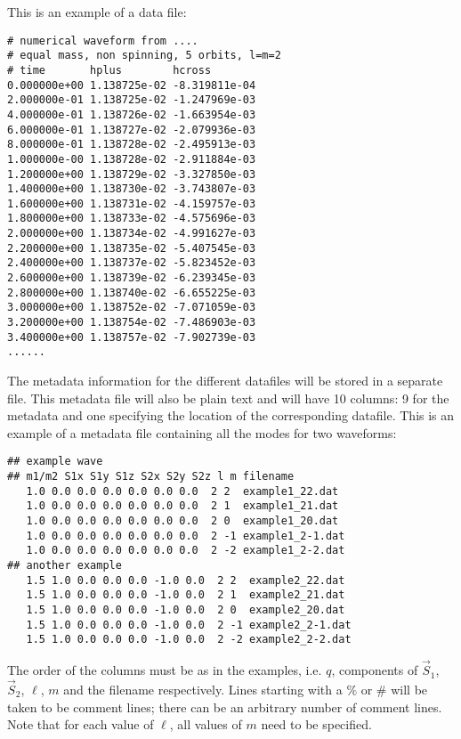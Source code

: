 \documentclass[10pt]{ligodcc}
\begin{document}
This is an example of a data file:

\begin{verbatim}
# numerical waveform from ....
# equal mass, non spinning, 5 orbits, l=m=2
# time       hplus        hcross
0.000000e+00 1.138725e-02 -8.319811e-04
2.000000e-01 1.138725e-02 -1.247969e-03
4.000000e-01 1.138726e-02 -1.663954e-03
6.000000e-01 1.138727e-02 -2.079936e-03
8.000000e-01 1.138728e-02 -2.495913e-03
1.000000e-00 1.138728e-02 -2.911884e-03
1.200000e+00 1.138729e-02 -3.327850e-03
1.400000e+00 1.138730e-02 -3.743807e-03
1.600000e+00 1.138731e-02 -4.159757e-03
1.800000e+00 1.138733e-02 -4.575696e-03
2.000000e+00 1.138734e-02 -4.991627e-03
2.200000e+00 1.138735e-02 -5.407545e-03
2.400000e+00 1.138737e-02 -5.823452e-03
2.600000e+00 1.138739e-02 -6.239345e-03
2.800000e+00 1.138740e-02 -6.655225e-03
3.000000e+00 1.138752e-02 -7.071059e-03
3.200000e+00 1.138754e-02 -7.486903e-03
3.400000e+00 1.138757e-02 -7.902739e-03
......
\end{verbatim}

The metadata information for the different datafiles will be stored in
a separate file.  This metadata file will also be plain text and
will have 10 columns: 9 for the metadata and one specifying
the location of the corresponding datafile.  This is an example of a
metadata file containing all the modes for two waveforms:
\begin{verbatim}
## example wave
## m1/m2 S1x S1y S1z S2x S2y S2z l m filename
   1.0 0.0 0.0 0.0 0.0 0.0 0.0  2 2  example1_22.dat
   1.0 0.0 0.0 0.0 0.0 0.0 0.0  2 1  example1_21.dat
   1.0 0.0 0.0 0.0 0.0 0.0 0.0  2 0  example1_20.dat
   1.0 0.0 0.0 0.0 0.0 0.0 0.0  2 -1 example1_2-1.dat
   1.0 0.0 0.0 0.0 0.0 0.0 0.0  2 -2 example1_2-2.dat
## another example
   1.5 1.0 0.0 0.0 0.0 -1.0 0.0  2 2  example2_22.dat
   1.5 1.0 0.0 0.0 0.0 -1.0 0.0  2 1  example2_21.dat
   1.5 1.0 0.0 0.0 0.0 -1.0 0.0  2 0  example2_20.dat
   1.5 1.0 0.0 0.0 0.0 -1.0 0.0  2 -1 example2_2-1.dat
   1.5 1.0 0.0 0.0 0.0 -1.0 0.0  2 -2 example2_2-2.dat
\end{verbatim}
The order of the columns must be as in the examples, i.e. $q$,
components of $\vec{S}_1$, $\vec{S}_2$, $\ell$, $m$ and the filename
respectively.  Lines starting with a $\%$ or $\#$ will be taken to be
comment lines; there can be an arbitrary number of comment lines.
Note that for each value of $\ell$, all values of $m$ need to be
specified.
\end{document}
